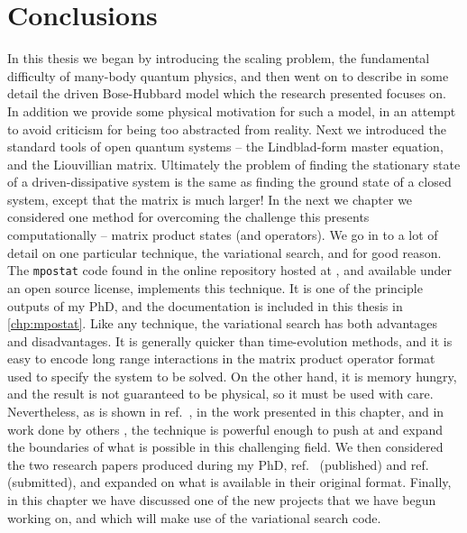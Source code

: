 \section{Conclusions} 
In this thesis we began by introducing the scaling problem, the fundamental difficulty of many-body quantum physics, and then went on to describe in some detail the driven Bose-Hubbard model which the research presented focuses on. In addition we provide some physical motivation for such a model, in an attempt to avoid criticism for being too abstracted from reality. Next we introduced the standard tools of open quantum systems -- the Lindblad-form master equation, and the Liouvillian matrix. Ultimately the problem of finding the stationary state of a driven-dissipative system is the same as finding the ground state of a closed system, except that the matrix is much larger! In the next we chapter we considered one method for overcoming the challenge this presents computationally -- matrix product states (and operators). We go in to a lot of detail on one particular technique, the variational search, and for good reason. The \lstinline$mpostat$ code found in the online repository hosted at \cite{otb:gitVSSS}, and available under an open source license, implements this technique. It is one of the principle outputs of my PhD, and the documentation is included in this thesis in \cref{chp:mpostat}. Like any technique, the variational search has both advantages and disadvantages. It is generally quicker than time-evolution methods, and it is easy to encode long range interactions in the matrix product operator format used to specify the system to be solved. On the other hand, it is memory hungry, and the result is not guaranteed to be physical, so it must be used with care. Nevertheless, as is shown in ref.~\cite{Owen2017}, in the work presented in this chapter, and in work done by others \cite{Cui2015,Mascarenhas2015}, the technique is powerful enough to push at and expand the boundaries of what is possible in this challenging field. We then considered the two research papers produced during my PhD, ref.~\cite{Owen2017} (published) and ref.~\cite{Brown2018} (submitted), and expanded on what is available in their original format. Finally, in this chapter we have discussed one of the new projects that we have begun working on, and which will make use of the variational search code.

